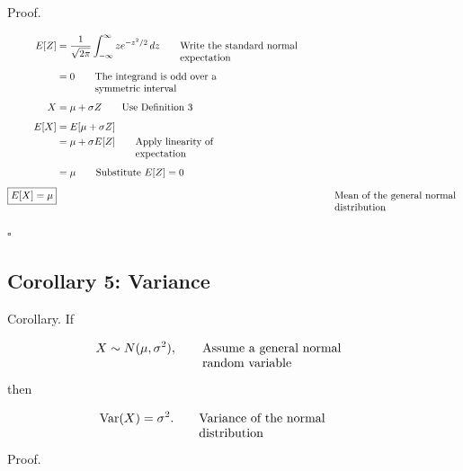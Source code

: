 \documentclass{article}
\newcommand{\justwidth}{0.36\textwidth}
\newcommand{\just}[1]{\parbox[t]{\justwidth}{\raggedright #1}}
\begin{document}
Proof.

\begin{align*}
E[Z]
&=
\frac{1}{\sqrt{2\pi}}
\int_{-\infty}^{\infty}
z e^{-z^2/2}\,dz
\tag*{\just{Write the standard normal expectation}}
\\[0.45em]
&=
0
\tag*{\just{The integrand is odd over a symmetric interval}}
\\[0.45em]
X
&=
\mu+\sigma Z
\tag*{\just{Use Definition 3}}
\\[0.45em]
E[X]
&=
E[\mu+\sigma Z]
\\
&=
\mu+\sigma E[Z]
\tag*{\just{Apply linearity of expectation}}
\\[0.45em]
&=
\mu
\tag*{\just{Substitute $E[Z]=0$}}
\\[0.45em]
\boxed{
E[X]
=
\mu
}
&&
\tag*{\just{Mean of the general normal distribution}}
\end{align*}

$\square$

\subsection{Corollary 5: Variance}
Corollary. If

\begin{align*}
X
&\sim
N(\mu,\sigma^2),
\tag*{\just{Assume a general normal random variable}}
\end{align*}

then

\begin{align*}
\operatorname{Var}(X)
&=
\sigma^2.
\tag*{\just{Variance of the normal distribution}}
\end{align*}

Proof.
\end{document}
